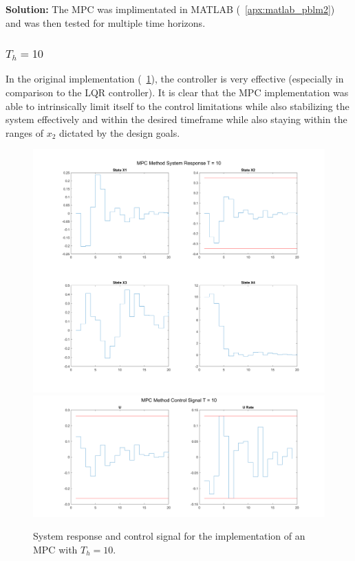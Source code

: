 \documentclass[letter]{article}
\begin{document}
\noindent
\textbf{Solution:}
The MPC was implimentated in MATLAB (\appendixname \ \ref{apx:matlab_pblm2}) and was then tested for multiple time horizons.

\subsubsection{$T_h = 10$}
In the original implementation (\figurename \ \ref{fig:pblm2mpcT10}), the controller is very effective (especially in comparison to the LQR controller). It is clear that the MPC implementation was able to intrinsically limit itself to the control limitations while also stabilizing the system effectively and within the desired timeframe while also staying within the ranges of $x_2$ dictated by the design goals.

\begin{figure}[p]
	\centering
	\includegraphics[width=\linewidth]{fig/pblm2_MPC_T10_sys_response}
	\includegraphics[width=\linewidth]{fig/pblm2_MPC_T10_ctrl_signal}
	\caption{System response and control signal for the implementation of an MPC with $T_h = 10$.}
	\label{fig:pblm2mpcT10}
\end{figure}
\end{document}
